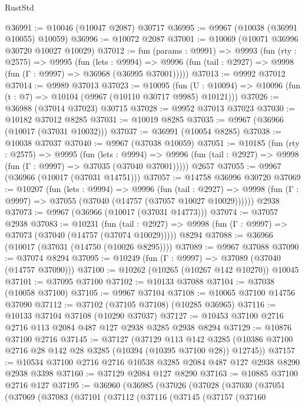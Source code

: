 \begin{lexlean}{RustStd}
\begin{coremodule}
@36991 := @10046 (@10047 @2087) @30717
@36995 := @9967 (@10038 (@36991 @10055) @10059)
@36996 := @10072 @2087
@37001 := @10069 (@10071 @36996 @30720 @10027 @10029)
@37012 := fun (params : @9991) =>
  @9993
    (fun (rty : @2575) =>
    @9995
      (fun (lets : @9994) =>
      @9996 (fun (tail : @2927) => @9998 (fun (Γ : @9997) => @36968 (@36995 @37001)))))
@37013 := @9992 @37012
@37014 := @9989 @37013
@37023 := @10095
    (fun (U : @10094) => @10096 (fun (t : @7) => @10104 (@9967 (@10110 @30717 @9985) @10121)))
@37026 := @36988 (@37014 @37023) @30715
@37028 := @9952 @37013 @37023
@37030 := @10182 @37012 @8285
@37031 := @10019 @8285
@37035 := @9967 (@36966 (@10017 (@37031 @10032)))
@37037 := @36991 (@10054 @8285)
@37038 := @10038 @37037
@37040 := @9967 (@37038 @10059)
@37051 := @10185
    (fun (rty : @2575) =>
    @9995
      (fun (lets : @9994) =>
      @9996 (fun (tail : @2927) => @9998 (fun (Γ : @9997) => @37035 (@37040 @37001)))))
    @2657
@37055 := @9967 (@36966 (@10017 (@37031 @14751)))
@37057 := @14758 @36996 @30720
@37069 := @10207
    (fun (lets : @9994) =>
    @9996
      (fun (tail : @2927) =>
      @9998 (fun (Γ : @9997) => @37055 (@37040 (@14757 (@37057 @10027 @10029))))))
    @2938
@37073 := @9967 (@36966 (@10017 (@37031 @14773)))
@37074 := @37057 @2938
@37083 := @10231
    (fun (tail : @2927) => @9998 (fun (Γ : @9997) => @37073 (@37040 (@14757 (@37074 @10029)))))
    @8294
@37088 := @36966 (@10017 (@37031 (@14750 (@10026 @8295))))
@37089 := @9967 @37088
@37090 := @37074 @8294
@37095 := @10249 (fun (Γ : @9997) => @37089 (@37040 (@14757 @37090)))
@37100 := @10262 (@10265 (@10267 @142 @10270)) @10045
@37101 := @37095 @37100
@37102 := @10133 @37088
@37104 := @37038 (@10058 @37100)
@37105 := @9967 @37104
@37108 := @10065 @37100 @14756 @37090
@37112 := @37102 (@37105 @37108) (@10285 @36965)
@37116 := @10133 @37104 @37108 (@10290 @37037)
@37127 := @10453 @37100 @2716 @2716 @113 @2084 @487 @127 @2938 @3285 @2938 @8294
@37129 := @10876 @37100 @2716
@37145 := @37127
    (@37129
      @113
      @142
      @3285
      (@10386 @37100 @2716 @28 @142 @28 @3285 (@10394 (@10395 @37100 @28)) @12745))
@37157 := @10534 @37100 @2716 @2716 @10538 @3285 @2084 @487 @127 @2938 @8290 @2938 @3398
@37160 := @37129 @2084 @127 @8290
@37163 := @10885 @37100 @2716 @127
@37195 := @36960
    (@36985
      (@37026
        (@37028
          (@37030
            (@37051
              (@37069
                (@37083
                  (@37101
                    (@37112
                      (@37116
                        (@37145
                          (@37157
                            (@37160

\end{coremodule}
\end{lexlean}

